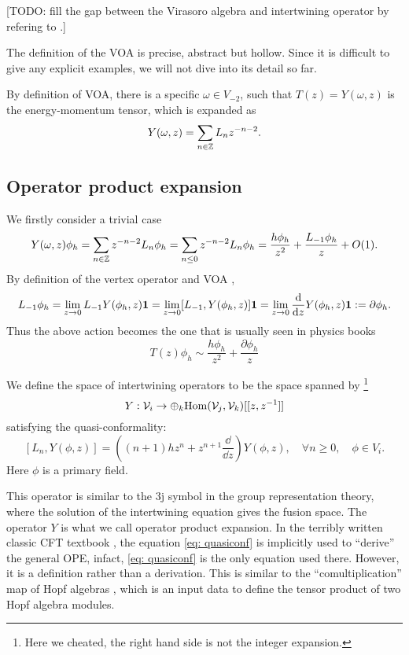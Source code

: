 \documentclass{article}
\begin{document}
[TODO: fill the gap between the Virasoro algebra and intertwining operator by refering to \cite{vertex_operator_algebra:Wikipedia}.]

The definition of the VOA is precise, abstract but hollow. Since it is difficult to give any explicit examples, we will not dive into its detail so far.

By definition of VOA, there is a specific $\omega\in V_{-2}$, such that $T(z) = Y(\omega, z)$ is the energy-momentum tensor, which is expanded as
\[
Y(\omega, z) = \sum_{n\in\mathbb{Z}}L_n z^{-n-2}.
\]

\subsection{Operator product expansion}
We firstly consider a trivial case
\[
Y(\omega, z)\phi_h = \sum_{n\in\mathbb{Z}}z^{-n-2}L_n\phi_h = \sum_{n\leq 0}z^{-n-2}L_n\phi_h = \frac{h\phi_h}{z^2}+\frac{L_{-1}\phi_h}{z}+O(1).
\]
By definition of the vertex operator and VOA \cite{vertex_operator_algebra:Wikipedia}, 
\[
L_{-1}\phi_h = \lim_{z\rightarrow 0}L_{-1}Y(\phi_h, z)\mathbf{1} = \lim_{z\rightarrow 0}[L_{-1},Y(\phi_h, z)]\mathbf{1} = \lim_{z\rightarrow 0}\frac{\mathrm{d}}{\mathrm{d} z}Y(\phi_h, z)\mathbf{1} := \partial \phi_h.
\]
Thus the above action becomes the one that is usually seen in physics books
\[
T(z)\phi_h \sim \frac{h\phi_h}{z^2}+\frac{\partial \phi_h}{z}
\]


We define \cite{Moore:1988qv} the space of intertwining operators to be the space spanned by \footnote{Here we cheated, the right hand side is not the integer expansion.}
\[
Y:{\cal V}_i\rightarrow \oplus_{k}\mathrm{Hom}({\cal V}_{j},{\cal V}_{k})[[z,z^{-1}]]
\]
satisfying the quasi-conformality:
\begin{equation}\label{eq: quasiconf}
    [L_n, Y(\phi, z)] = \left((n+1)hz^n + z^{n+1}\frac{\dd}{\dd z}\right)Y(\phi, z),\quad \forall n\geq 0,\quad \phi\in V_{i}.
\end{equation}
Here $\phi$ is a primary field. 

This operator is similar to the 3j symbol in the group representation theory, where the solution of the intertwining equation gives the fusion space. The operator $Y$ is what we call operator product expansion. In the terribly written classic CFT textbook \cite{Francesco1997}, the equation \eqref{eq: quasiconf} is implicitly used to ``derive'' the general OPE, infact, \eqref{eq: quasiconf} is the only equation used there. However, it is a definition rather than a derivation. This is similar to the ``comultiplication'' map of Hopf algebras \cite{Moore:1988qv}, which is an input data to define the tensor product of two Hopf algebra modules.
\end{document}
